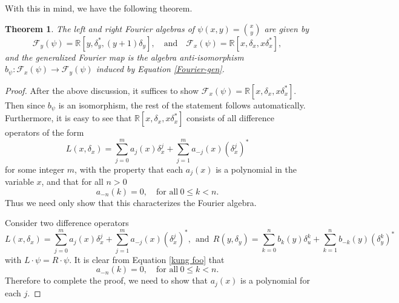 \documentclass[11pt]{amsart}
\theoremstyle{plain}
\newtheorem{theorem}{Theorem}[section]
\newcommand \bth[1] { \begin{theorem}\label{t#1} }
\renewcommand {\eth} { \end{theorem} }
\theoremstyle{named}
\begin{document}
With this in mind, we have the following theorem.
\bth{thm:Fourier}\label{thm:Fourier}
The left and right Fourier algebras of $\psi(x,y) = \binom{x}{y}$ are given by
$$\mathcal F_y(\psi) = \mathbb R[y,\delta_y^*,(y+1)\delta_y],\quad \text{and}\quad \mathcal F_x(\psi) = \mathbb R[x,\delta_x,x\delta_x^*],$$
and the generalized Fourier map is the algebra anti-isomorphism $b_\psi: \mathcal F_x(\psi)\rightarrow\mathcal F_y(\psi)$ induced by Equation \eqref{Fourier-gen}.
\eth
\begin{proof}
After the above discussion, it suffices to show $\mathcal F_x(\psi) = \mathbb R[x,\delta_x,x\delta_x^*]$.
Then since $b_\psi$ is an isomorphism, the rest of the statement follows automatically.
Furthermore, it is easy to see that $\mathbb R[x,\delta_x,x\delta_x^*]$ consists of all difference operators of the form
$$L(x,\delta_x) = \sum_{j=0}^m a_j(x)\delta_x^j + \sum_{j=1}^{m} a_{-j}(x)(\delta_x^j)^*$$
for some integer $m$, with the property that each $a_j(x)$ is a polynomial in the variable $x$, and that for all $n>0$
$$a_{-n}(k) = 0,\quad\text{for all}\ 0 \leq k < n.$$
Thus we need only show that this characterizes the Fourier algebra.

Consider two difference operators
$$L(x,\delta_x) = \sum_{j=0}^m a_j(x)\delta_x^j + \sum_{j=1}^{m} a_{-j}(x)(\delta_x^j)^*,\ \ \text{and}\ \ R(y,\delta_y) = \sum_{k=0}^n b_k(y)\delta_u^k + \sum_{k=1}^{n} b_{-k}(y)(\delta_y^k)^*$$
with $L\cdot\psi = R\cdot\psi$.
It is clear from Equation \eqref{kung foo} that $$a_{-n}(k) = 0,\quad\text{for all}\ 0 \leq k < n.$$
Therefore to complete the proof, we need to show that $a_j(x)$ is a polynomial for each $j$.


\end{proof}
\end{document}
